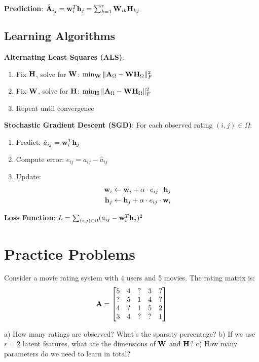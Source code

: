 \documentclass{article}
\begin{document}
\textbf{Prediction}: $\hat{\mathbf{A}}_{ij} = \mathbf{w}_i^T \mathbf{h}_j = \sum_{k=1}^r \mathbf{W}_{ik} \mathbf{H}_{kj}$

\subsection{Learning Algorithms}

\textbf{Alternating Least Squares (ALS)}:
\begin{enumerate}
    \item Fix $\mathbf{H}$, solve for $\mathbf{W}$: $\min_{\mathbf{W}} \|\mathbf{A}_{\Omega} - \mathbf{W}\mathbf{H}_{\Omega}\|_F^2$
    \item Fix $\mathbf{W}$, solve for $\mathbf{H}$: $\min_{\mathbf{H}} \|\mathbf{A}_{\Omega} - \mathbf{W}\mathbf{H}_{\Omega}\|_F^2$
    \item Repeat until convergence
\end{enumerate}

\textbf{Stochastic Gradient Descent (SGD)}:
For each observed rating $(i,j) \in \Omega$:
\begin{enumerate}
    \item Predict: $\hat{a}_{ij} = \mathbf{w}_i^T \mathbf{h}_j$
    \item Compute error: $e_{ij} = a_{ij} - \hat{a}_{ij}$
    \item Update: 
    \begin{align}
    \mathbf{w}_i &\leftarrow \mathbf{w}_i + \alpha \cdot e_{ij} \cdot \mathbf{h}_j \\
    \mathbf{h}_j &\leftarrow \mathbf{h}_j + \alpha \cdot e_{ij} \cdot \mathbf{w}_i
    \end{align}
\end{enumerate}

\textbf{Loss Function}: $L = \sum_{(i,j) \in \Omega} (a_{ij} - \mathbf{w}_i^T \mathbf{h}_j)^2$

\section{Practice Problems}

\begin{problembox}[title=Basic Matrix Factorization Setup]

Consider a movie rating system with 4 users and 5 movies. The rating matrix is:
$$\mathbf{A} = \begin{bmatrix}
5 & 4 & ? & 3 & ? \\
? & 5 & 1 & 4 & ? \\
4 & ? & 1 & 5 & 2 \\
3 & 4 & ? & ? & 1
\end{bmatrix}$$

a) How many ratings are observed? What's the sparsity percentage?
b) If we use $r=2$ latent features, what are the dimensions of $\mathbf{W}$ and $\mathbf{H}$?
c) How many parameters do we need to learn in total?
\end{problembox}
\end{document}
